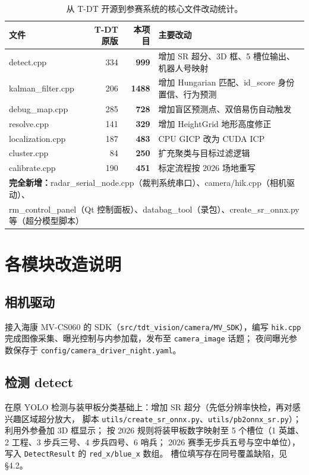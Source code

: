 \documentclass[11pt,a4paper,fontset=none]{ctexart}
\newcommand{\code}[1]{\texttt{#1}}
\begin{document}
\begin{table}[H]
\centering\small
\begin{tabularx}{\textwidth}{lrrX}
\toprule
文件 & T-DT 原版 & 本项目 & 主要改动 \\
\midrule
detect.cpp & 334 & \textbf{999} & 增加 SR 超分、3D 框、5 槽位输出、机器人号映射 \\
kalman\_filter.cpp & 206 & \textbf{1488} & 增加 Hungarian 匹配、id\_score 身份置信、行为预测 \\
debug\_map.cpp & 285 & \textbf{728} & 增加盲区预测点、双倍易伤自动触发 \\
resolve.cpp & 141 & \textbf{329} & 增加 HeightGrid 地形高度修正 \\
localization.cpp & 187 & \textbf{483} & CPU GICP 改为 CUDA ICP \\
cluster.cpp & 84 & \textbf{250} & 扩充聚类与目标过滤逻辑 \\
calibrate.cpp & 190 & \textbf{451} & 标定流程按 2026 场地重写 \\
\midrule
\multicolumn{4}{l}{\textbf{完全新增：}radar\_serial\_node.cpp（裁判系统串口）、camera/hik.cpp（相机驱动）、}\\
\multicolumn{4}{l}{rm\_control\_panel（Qt 控制面板）、databag\_tool（录包）、create\_sr\_onnx.py 等（超分模型脚本）}\\
\bottomrule
\end{tabularx}
\caption{从 T-DT 开源到参赛系统的核心文件改动统计。}
\end{table}

\section{各模块改造说明}

\subsection{相机驱动}
接入海康 MV-CS060 的 SDK（\code{src/tdt\_vision/camera/MV\_SDK}），编写 \code{hik.cpp}
完成图像采集、曝光控制与内参加载，发布至 \code{camera\_image} 话题；
夜间曝光参数保存于 \code{config/camera\_driver\_night.yaml}。

\subsection{检测 detect}
在原 YOLO 检测与装甲板分类基础上：增加 SR 超分（先低分辨率快检，再对感兴趣区域超分放大，
脚本 \code{utils/create\_sr\_onnx.py}、\code{utils/pb2onnx\_sr.py}）；利用外参叠加 3D 框显示；
按 2026 规则将装甲板数字映射至 5 个槽位（1 英雄、2 工程、3 步兵三号、4 步兵四号、6 哨兵；
2026 赛季无步兵五号与空中单位），写入 \code{DetectResult} 的 \code{red\_x/blue\_x} 数组。
槽位填写存在同号覆盖缺陷，见 \S4.2。
\end{document}
